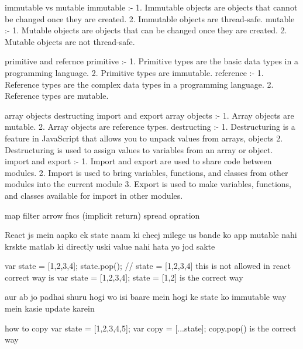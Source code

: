 immutable vs mutable
immutable :- 
1. Immutable objects are objects that cannot be changed once they are created.
2. Immutable objects are thread-safe.
mutable :-
1. Mutable objects are objects that can be changed once they are created.
2. Mutable objects are not thread-safe.

primitive and refernce 
primitive :-
1. Primitive types are the basic data types in a programming language.
2. Primitive types are immutable.
reference :-
1. Reference types are the complex data types in a programming language.
2. Reference types are mutable.

array objects destructing import and export 
array objects :-
1. Array objects are mutable.
2. Array objects are reference types.
destructing :-
1. Destructuring is a feature in JavaScript that allows you to unpack values from arrays, objects
2. Destructuring is used to assign values to variables from an array or object.
import and export :-
1. Import and export are used to share code between modules.
2. Import is used to bring variables, functions, and classes from other modules into the current module
3. Export is used to make variables, functions, and classes available for import in other modules.

map filter arrow fncs (implicit return) spread opration

React js mein aapko ek state naam ki cheej milege us bande ko app mutable nahi krskte matlab ki directly uski value nahi hata yo jod sakte 

var state = [1,2,3,4];
 state.pop(); // state = [1,2,3,4]
 this is not allowed in react 
 correct way is 
 var state = [1,2,3,4];
 state = [1,2] is the correct way

aur ab jo padhai shuru hogi wo isi baare mein hogi ke state ko immutable way mein kasie update karein 

how to copy 
var state = [1,2,3,4,5];
var copy = [...state];
copy.pop()
is the correct way